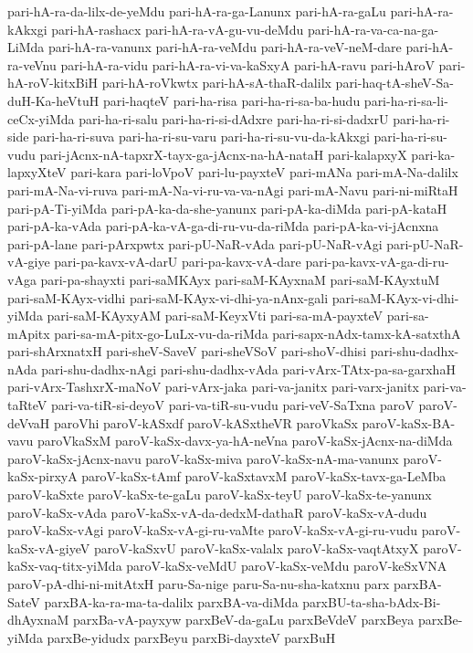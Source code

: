 {pari-hA-ra-da-lilx-de-yeMdu
pari-hA-ra-ga-Lanunx
pari-hA-ra-gaLu
pari-hA-ra-kAkxgi
pari-hA-rashacx
pari-hA-ra-vA-gu-vu-deMdu
pari-hA-ra-va-ca-na-ga-LiMda
pari-hA-ra-vanunx
pari-hA-ra-veMdu
pari-hA-ra-veV-neM-dare
pari-hA-ra-veVnu
pari-hA-ra-vidu
pari-hA-ra-vi-va-kaSxyA
pari-hA-ravu
pari-hAroV
pari-hA-roV-kitxBiH
pari-hA-roVkwtx
pari-hA-sA-thaR-dalilx
pari-haq-tA-sheV-Sa-duH-Ka-heVtuH
pari-haqteV
pari-ha-risa
pari-ha-ri-sa-ba-hudu
pari-ha-ri-sa-li-ceCx-yiMda
pari-ha-ri-salu
pari-ha-ri-si-dAdxre
pari-ha-ri-si-dadxrU
pari-ha-ri-side
pari-ha-ri-suva
pari-ha-ri-su-varu
pari-ha-ri-su-vu-da-kAkxgi
pari-ha-ri-su-vudu
pari-jAcnx-nA-tapxrX-tayx-ga-jAcnx-na-hA-nataH
pari-kalapxyX
pari-ka-lapxyXteV
pari-kara
pari-loVpoV
pari-lu-payxteV
pari-mANa
pari-mA-Na-dalilx
pari-mA-Na-vi-ruva
pari-mA-Na-vi-ru-va-va-nAgi
pari-mA-Navu
pari-ni-miRtaH
pari-pA-Ti-yiMda
pari-pA-ka-da-she-yanunx
pari-pA-ka-diMda
pari-pA-kataH
pari-pA-ka-vAda
pari-pA-ka-vA-ga-di-ru-vu-da-riMda
pari-pA-ka-vi-jAcnxna
pari-pA-lane
pari-pArxpwtx
pari-pU-NaR-vAda
pari-pU-NaR-vAgi
pari-pU-NaR-vA-giye
pari-pa-kavx-vA-darU
pari-pa-kavx-vA-dare
pari-pa-kavx-vA-ga-di-ru-vAga
pari-pa-shayxti
pari-saMKAyx
pari-saM-KAyxnaM
pari-saM-KAyxtuM
pari-saM-KAyx-vidhi
pari-saM-KAyx-vi-dhi-ya-nAnx-gali
pari-saM-KAyx-vi-dhi-yiMda
pari-saM-KAyxyAM
pari-saM-KeyxVti
pari-sa-mA-payxteV
pari-sa-mApitx
pari-sa-mA-pitx-go-LuLx-vu-da-riMda
pari-sapx-nAdx-tamx-kA-satxthA
pari-shArxnatxH
pari-sheV-SaveV
pari-sheVSoV
pari-shoV-dhisi
pari-shu-dadhx-nAda
pari-shu-dadhx-nAgi
pari-shu-dadhx-vAda
pari-vArx-TAtx-pa-sa-garxhaH
pari-vArx-TashxrX-maNoV
pari-vArx-jaka
pari-va-janitx
pari-varx-janitx
pari-va-taRteV
pari-va-tiR-si-deyoV
pari-va-tiR-su-vudu
pari-veV-SaTxna
paroV
paroV-deVvaH
paroVhi
paroV-kASxdf
paroV-kASxtheVR
paroVkaSx
paroV-kaSx-BA-vavu
paroVkaSxM
paroV-kaSx-davx-ya-hA-neVna
paroV-kaSx-jAcnx-na-diMda
paroV-kaSx-jAcnx-navu
paroV-kaSx-miva
paroV-kaSx-nA-ma-vanunx
paroV-kaSx-pirxyA
paroV-kaSx-tAmf
paroV-kaSxtavxM
paroV-kaSx-tavx-ga-LeMba
paroV-kaSxte
paroV-kaSx-te-gaLu
paroV-kaSx-teyU
paroV-kaSx-te-yanunx
paroV-kaSx-vAda
paroV-kaSx-vA-da-dedxM-dathaR
paroV-kaSx-vA-dudu
paroV-kaSx-vAgi
paroV-kaSx-vA-gi-ru-vaMte
paroV-kaSx-vA-gi-ru-vudu
paroV-kaSx-vA-giyeV
paroV-kaSxvU
paroV-kaSx-valalx
paroV-kaSx-vaqtAtxyX
paroV-kaSx-vaq-titx-yiMda
paroV-kaSx-veMdU
paroV-kaSx-veMdu
paroV-keSxVNA
paroV-pA-dhi-ni-mitAtxH
paru-Sa-nige
paru-Sa-nu-sha-katxnu
parx
parxBA-SateV
parxBA-ka-ra-ma-ta-dalilx
parxBA-va-diMda
parxBU-ta-sha-bAdx-Bi-dhAyxnaM
parxBa-vA-payxyw
parxBeV-da-gaLu
parxBeVdeV
parxBeya
parxBe-yiMda
parxBe-yidudx
parxBeyu
parxBi-dayxteV
parxBuH
}
